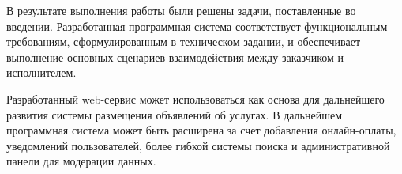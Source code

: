 В результате выполнения работы были решены задачи, поставленные во введении. Разработанная программная система соответствует функциональным требованиям, сформулированным в техническом задании, и обеспечивает выполнение основных сценариев взаимодействия между заказчиком и исполнителем.

Разработанный web-сервис может использоваться как основа для дальнейшего развития системы размещения объявлений об услугах. В дальнейшем программная система может быть расширена за счет добавления онлайн-оплаты, уведомлений пользователей, более гибкой системы поиска и административной панели для модерации данных.